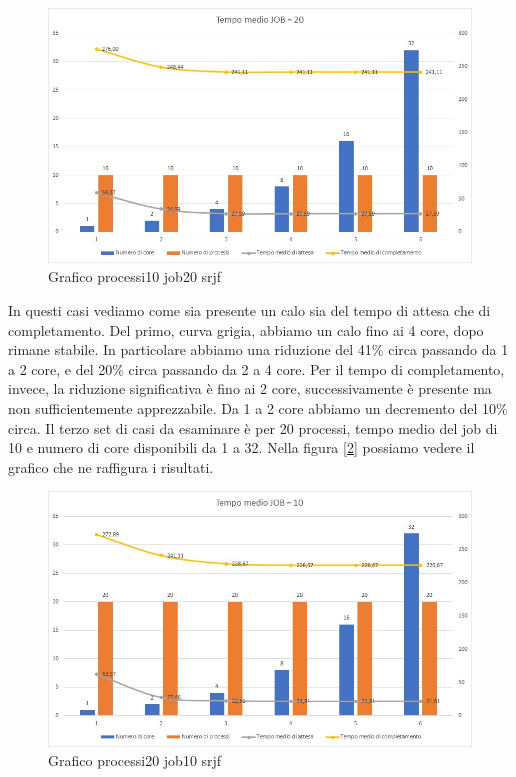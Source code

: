 \documentclass[Lau, oneside]{sapthesis}%
\begin{document}
\begin{figure}[ht!]
  \centering
  \includegraphics[width=1\textwidth]{Grafico processi10job20 srjf.jpg}
  \caption{Grafico processi10 job20 srjf}
  \label{figura:p10j20srjf}
\end{figure}
In questi casi vediamo come sia presente un calo sia del tempo di attesa che di completamento.
Del primo, curva grigia, abbiamo un calo fino ai 4 core, dopo rimane stabile.
In particolare abbiamo una riduzione del 41\% circa passando da 1 a 2 core, e del 20\% circa passando da 2 a 4 core.
Per il tempo di completamento, invece, la riduzione significativa è fino ai 2 core, successivamente è presente ma non sufficientemente apprezzabile.
Da 1 a 2 core abbiamo un decremento del 10\% circa.
Il terzo set di casi da esaminare è per 20 processi, tempo medio del job di 10 e numero di core disponibili da 1 a 32.
Nella figura \hyperref[figura:p20j10srjf]{[\ref*{figura:p20j10srjf}]} possiamo vedere il grafico che ne raffigura i risultati.
\begin{figure}[ht!]
  \centering
  \includegraphics[width=1\textwidth]{Grafico processi20job10 srjf.jpg}
  \caption{Grafico processi20 job10 srjf}
  \label{figura:p20j10srjf}
\end{figure}
\end{document}
